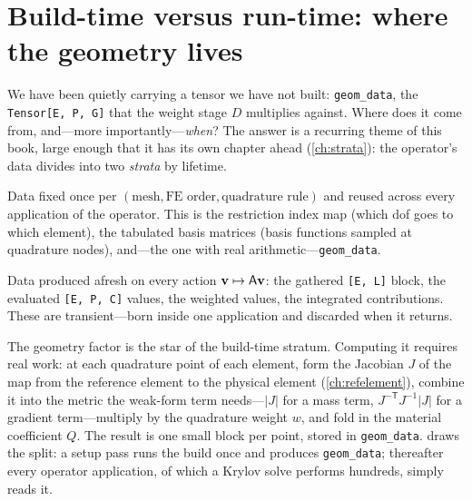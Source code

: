 \section{Build-time versus run-time: where the geometry lives}
\label{sec:mf-strata}

We have been quietly carrying a tensor we have not built: \texttt{geom\_data},
the \lstinline[style=l4style]|Tensor[E, P, G]| that the weight stage $D$
multiplies against. Where does it come from, and---more importantly---\emph{when}?
The answer is a recurring theme of this book, large enough that it has its own
chapter ahead (\cref{ch:strata}): the operator's data divides into two
\emph{strata} by lifetime.

\begin{description}[leftmargin=1.4em, style=nextline]
\item[Build-time (setup) stratum.] Data fixed once per
$(\text{mesh},\text{FE order},\text{quadrature rule})$ and reused across every
application of the operator. This is the restriction index map (which dof goes to
which element), the tabulated basis matrices (basis functions sampled at
quadrature nodes), and---the one with real arithmetic---\texttt{geom\_data}.
\item[Run-time (apply) stratum.] Data produced afresh on every action
$\mathbf{v}\mapsto\mathsf{A}\mathbf{v}$: the gathered \lstinline[style=l4style]|[E, L]| block, the
evaluated \lstinline[style=l4style]|[E, P, C]| values, the weighted values, the
integrated contributions. These are transient---born inside one application and
discarded when it returns.
\end{description}

The geometry factor is the star of the build-time stratum. Computing it requires
real work: at each quadrature point of each element, form the Jacobian $J$ of the
map from the reference element to the physical element (\cref{ch:refelement}),
combine it into the metric the weak-form term needs---$|J|$ for a mass term,
$J^{-\mathsf T}J^{-1}|J|$ for a gradient term---multiply by the quadrature weight
$w$, and fold in the material coefficient $Q$. The result is one small block per
point, stored in \texttt{geom\_data}.  draws the split: a
setup pass runs the build once and produces \texttt{geom\_data}; thereafter every
operator application, of which a Krylov solve performs hundreds, simply reads it.

